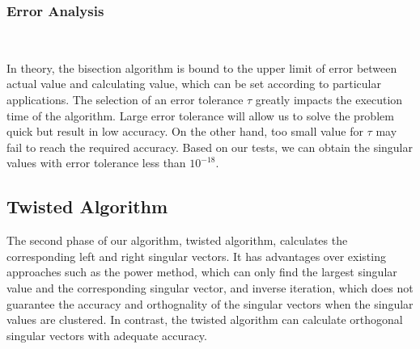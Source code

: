 
\subsubsection{Error Analysis}
~

In theory, the bisection algorithm is bound to the upper limit of error between actual value and calculating value, which can be set according to particular applications. 
The selection of an error tolerance $\tau$ greatly impacts the execution time of the algorithm. 
Large error tolerance will allow us to solve the problem quick but result in low accuracy.
On the other hand, too small value for $\tau$ may fail to reach the required accuracy.
Based on our tests, we can obtain the singular values with error tolerance less than $10^{-18}$.

\subsection{Twisted Algorithm}

The second phase of our algorithm, twisted algorithm, calculates the corresponding left and right singular vectors.
It has advantages over existing approaches such as the power method\cite{08power}, which can only find the largest singular value and the corresponding singular vector, and inverse iteration\cite{11iterative}, which does not guarantee the accuracy and orthognality of the singular vectors when the singular values are clustered. In contrast, the twisted algorithm \cite{09NLAAtwisted} can calculate  orthogonal singular vectors with adequate accuracy. 

